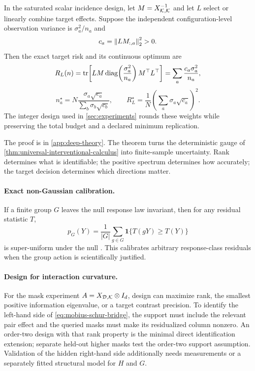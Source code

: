 \begin{corollary}
\label{cor:target-optimal-replication}
In the saturated scalar incidence design, let $M=X_{\mathcal K,\mathcal K}^{-1}$ and
let $L$ select or linearly combine target effects.  Suppose the independent
configuration-level observation variance is $\sigma_a^2/n_a$ and
\[
c_a=\left\lVert LM_{:,a}\right\rVert_2^2>0.
\]
Then the exact target risk and its continuous optimum are
\begin{equation}
R_L(n)=\operatorname{tr}\!\left[L M\operatorname{diag}\!\left(\frac{\sigma_a^2}{n_a}\right)M^\top L^\top\right]
=\sum_a\frac{c_a\sigma_a^2}{n_a},
\label{eq:target-replication-risk}
\end{equation}
\begin{equation}
n_a^\star
=N\frac{\sigma_a\sqrt{c_a}}{\sum_b\sigma_b\sqrt{c_b}},
\qquad
R_L^\star
=\frac1N\left(\sum_a\sigma_a\sqrt{c_a}\right)^2.
\label{eq:target-optimal-allocation}
\end{equation}
The integer design used in \cref{sec:experiments} rounds these weights while
preserving the total budget and a declared minimum replication.
\end{corollary}

The proof is in \cref{app:deep-theory}.  The theorem turns the deterministic gauge of \cref{thm:universal-interventional-calculus} into finite-sample uncertainty.  Rank determines what is identifiable; the positive spectrum determines how accurately; the target decision determines which directions matter.

\paragraph{Exact non-Gaussian calibration.}
If a finite group $G$ leaves the null response law invariant, then for any residual statistic $T$,
\begin{equation}
p_G(Y)=\frac1{|G|}\sum_{g\in G}\mathbf1\{T(gY)\ge T(Y)\}
\label{eq:exact-randomization-pvalue}
\end{equation}
is super-uniform under the null \citep{hemerik2018exact,phipson2010permutation}.  This calibrates arbitrary response-class residuals when the group action is scientifically justified.

\paragraph{Design for interaction curvature.}
For the mask experiment $A=X_{\mathcal D,\mathcal K}\otimes I_d$, design can maximize rank, the smallest positive information eigenvalue, or a target contrast precision.  To identify the left-hand side of \cref{eq:mobius-schur-bridge}, the support must include the relevant pair effect and the queried masks must make its residualized column nonzero.  An order-two design with that rank property is the minimal direct identification extension; separate held-out higher masks test the order-two support assumption.  Validation of the hidden right-hand side additionally needs measurements or a separately fitted structural model for $H$ and $G$.
